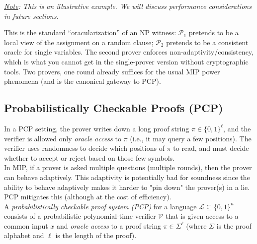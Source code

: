 \noindent \textit{\underline{Note}: This is an illustrative example. We will discuss performance considerations in future sections.} \\

\begin{remark}
This is the standard “oracularization” of an NP witness: $\mathcal{P}_1$ pretends to be a local view of the assignment on a random clause; $\mathcal{P}_2$ pretends to be a consistent oracle for single variables. The second prover enforces non-adaptivity/consistency, which is what you cannot get in the single-prover version without cryptographic tools. Two provers, one round already suffices for the usual MIP power phenomena (and is the canonical gateway to PCP).
\end{remark} 


\subsection{Probabilistically Checkable Proofs (PCP)}

In a PCP setting, the prover writes down a long proof string $\pi \in \{0,1\}^\ell$, and the verifier is allowed only \emph{oracle access} to $\pi$ (i.e., it may query a few positions). The verifier uses randomness to decide which positions of $\pi$ to read, and must decide whether to accept or reject based on those few symbols. \\

\noindent In MIP, if a prover is asked multiple questions (multiple rounds), then the prover can behave adaptively. This adaptivity is potentially bad for soundness since the ability to behave adaptively makes it harder to "pin down" the prover(s) in a lie. PCP mitigates this (although at the cost of efficiency). \\

\noindent A \emph{probabilistically checkable proof system (PCP)} for a language $\mathcal{L} \subseteq \{0,1\}^n$ consists of a probabilistic polynomial-time verifier $\mathcal{V}$ that is given access to a common input $x$ and \emph{oracle access} to a proof string $\pi \in \Sigma^\ell$ (where $\Sigma$ is the proof alphabet and $\ell$ is the length of the proof). 

